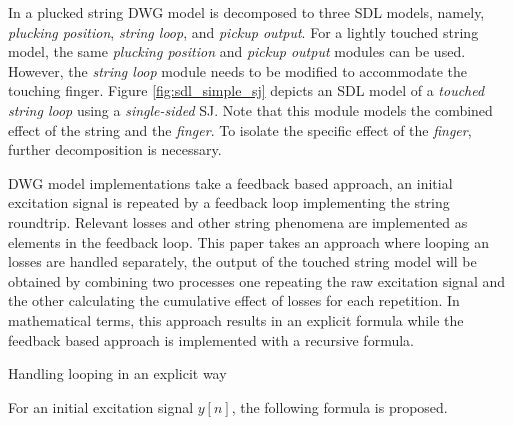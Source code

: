 \documentclass{sigchi}
\begin{document}
In \cite{karjalainen_plucked-string_1998} a plucked string DWG model is decomposed to three SDL models, namely, \textit{plucking position}, \textit{string loop}, and \textit{pickup output}.
For a lightly touched string model, the same \textit{plucking position} and \textit{pickup output} modules can be used.
However, the \textit{string loop} module needs to be modified to accommodate the touching finger.
Figure \ref{fig:sdl_simple_sj} depicts an SDL model of a \textit{touched string loop} using a \textit{single-sided} SJ.
Note that this module models the combined effect of the string and the \textit{finger}.
To isolate the specific effect of the \textit{finger}, further decomposition is necessary.
\begin{figure*}[h]
	\centering
	\scalebox{0.8}{}
	\caption{String loop with a scattering junction.}
	\label{fig:sdl_simple_sj}
\end{figure*}

DWG model implementations take a feedback based approach, an initial excitation signal is repeated by a feedback loop implementing the string roundtrip.
Relevant losses and other string phenomena are implemented as elements in the feedback loop.
This paper takes an approach where looping an losses are handled separately, the output of the touched string model will be obtained by combining two processes one repeating the raw excitation signal and the other calculating the cumulative effect of losses for each repetition.
In mathematical terms, this approach results in an explicit formula while the feedback based approach is implemented with a recursive formula.

Handling looping in an explicit way


For an initial excitation signal $y[n]$, the following formula is proposed.
\end{document}
